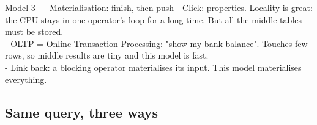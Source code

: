 \begin{frame}{Model 3 --- Materialisation: finish, then push}
{  - Click: properties. Locality is great: the CPU stays in one operator's loop for a long time. But all the middle tables must be stored.\\
  - OLTP = Online Transaction Processing: "show my bank balance". Touches few rows, so middle results are tiny and this model is fast.\\
  - Link back: a blocking operator materialises its input. This model materialises everything.
  }
\end{frame}

\subsection{Same query, three ways}
